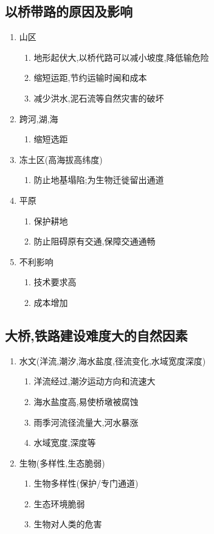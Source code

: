 \documentclass[a4paper]{article}
\begin{document}
    \subsection{以桥带路的原因及影响}
    \begin{enumerate}
        \item 山区
        \begin{enumerate}
            \item 地形起伏大,以桥代路可以减小坡度,降低输危险
            \item 缩短运距,节约运输时闽和成本
            \item 减少洪水,泥石流等自然灾害的破坏
        \end{enumerate}
        \item 跨河,湖,海
        \begin{enumerate}
            \item 缩短选距
        \end{enumerate}
        \item 冻土区(高海拔高纬度)
        \begin{enumerate}
            \item 防止地基塌陷;为生物迁徙留出通道
        \end{enumerate}
        \item 平原
        \begin{enumerate}
            \item 保护耕地
            \item 防止阻碍原有交通,保障交通通畅
        \end{enumerate}
        \item 不利影响
        \begin{enumerate}
            \item 技术要求高
            \item 成本增加
        \end{enumerate}
    \end{enumerate}
    \subsection{大桥,铁路建设难度大的自然因素}
    \begin{enumerate}
        \item 水文(洋流,潮汐,海水盐度,径流变化,水域宽度深度)
        \begin{enumerate}
            \item 洋流经过,潮汐运动方向和流速大
            \item 海水盐度高,易使桥墩被腐蚀
            \item 雨季河流径流量大,河水暴涨
            \item 水域宽度,深度等
        \end{enumerate}
        \item 生物(多样性,生态脆弱)
        \begin{enumerate}
            \item 生物多样性(保护/专门通道)
            \item 生态环境脆弱
            \item 生物对人类的危害
        \end{enumerate}
    \end{enumerate}
\end{document}
